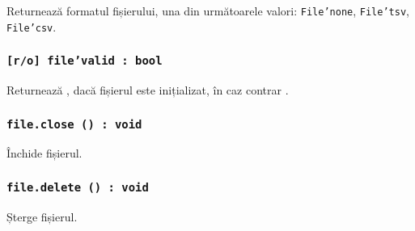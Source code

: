 Returnează formatul fișierului, una din următoarele valori: \texttt{File'none}, \texttt{File'tsv}, \texttt{File'csv}.

\subsubsection{\texttt{[r/o] file'valid : bool}}

Returnează \true, dacă fișierul este inițializat, în caz contrar \false.

\subsubsection{\texttt{file.close () : void}}

Închide fișierul.

\subsubsection{\texttt{file.delete () : void}}

Șterge fișierul.
